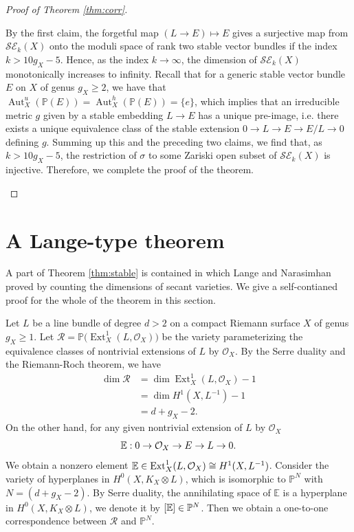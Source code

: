 \documentclass[12pt]{article}
\begin{document}
\begin{proof}[Proof of Theorem \ref{thm:corr}]
\begin{enumerate}
By the first claim,  the forgetful map $(L\to E)\mapsto E$ gives a surjective map from ${\mathcal {SE}}_k(X)$ onto the moduli space of rank two stable vector bundles if the index $k > 10g_{X} - 5$. Hence, as the index $k\to\infty$, the dimension of ${\mathcal {SE}}_k(X)$  monotonically increases to infinity.  Recall that for a generic stable vector bundle $E$ on $X$ of genus $g_{X} \geq 2$, we have that $\operatorname{Aut}_{X}^{u} (\mathbb{P}(E)) =\operatorname{Aut}_{X}^{h} (\mathbb{P}(E))=\{e\}$, which implies that an irreducible metric $g$ given by a stable embedding $L\to E$ has a unique pre-image, i.e. there exists a unique equivalence class of the stable extension $0\to L\to E\to E/L\to 0$ defining $g$.
Summing up this and the preceding two claims, we find that, as $k > 10g_{X} - 5$, the restriction of $\sigma$ to some Zariski open subset
of ${\mathcal {SE}}_k(X)$  is injective.
Therefore, we complete the proof of the theorem.

\end{enumerate}
\end{proof}

\section{A Lange-type theorem}
\label{sec:langetype}
A part of Theorem \ref{thm:stable} is contained in \cite[Proposition 1.1]{LN83} which Lange and Narasimhan proved by counting the dimensions of secant varieties. We give a self-contianed proof for the whole of the theorem in this section.

Let $L$ be a line bundle of degree $d > 2$ on a compact Riemann surface $X$ of genus $g_{X} \geq 1$. Let $\mathcal{R} = \mathbb{P} \big( \operatorname{Ext}_{X}^{1}(L, \mathcal O_{X})\big)$ be the variety parameterizing the equivalence classes of nontrivial extensions of $L$ by $\mathcal O_{X}$. By the Serre duality and the Riemann-Roch theorem, we have
\begin{align*}
\dim \mathcal{R} &= \dim \operatorname{Ext}_{X}^{1}(L, \mathcal O_{X}) -1 \\
&= \dim H^{1}(X, L^{-1}) - 1 \\
&= d + g_{X} - 2.
\end{align*}
On the other hand, for any given nontrivial extension of $L$ by $\mathcal O_{X}$
\[ {\Bbb E}:  0 \rightarrow \mathcal O_{X} \rightarrow E \rightarrow L \rightarrow 0. \]
We obtain a nonzero element ${\Bbb E} \in \operatorname{Ext}_{X}^{1}(L, \mathcal O_{X}) \cong H^{1}(X, L^{-1})$. Consider the variety of hyperplanes in $H^{0}(X, K_{X} \otimes L)$, which is isomorphic to $\mathbb{P}^{N}$ with $N =(d + g_{X} - 2)$.  By Serre duality, the annihilating space of $\mathbb E$ is a hyperplane in $H^{0}(X, K_{X} \otimes L)$,  we denote it by $[{\Bbb E}] \in \mathbb{P}^{N}$. Then we obtain a one-to-one correspondence between $\mathcal{R}$ and $\mathbb{P}^{N}$.
\end{document}
